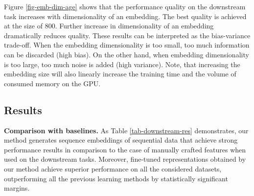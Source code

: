 \documentclass{article}
\begin{document}
Figure \ref{fig-emb-dim-age} shows that the performance quality on the downstream task increases with  dimensionality of an embedding. The best quality is achieved at the size of 800. Further increase in  dimensionality of an embedding dramatically reduces quality.
These results can be interpreted as the bias-variance trade-off. When the embedding dimensionality is too small, too much information can be discarded (high bias). On the other hand, when embedding dimensionality is too large, too much noise is added (high variance).
Note, that increasing the embedding size will also linearly increase the training time and the volume of consumed memory on the GPU.

\subsection{Results} \label{sec-res}

\textbf{Comparison with baselines.} As Table \ref{tab-downstream-res} demonstrates, our method generates sequence embeddings of sequential data that achieve strong performance results in comparison to the case of manually crafted features when used on the downstream tasks. Moreover, fine-tuned representations obtained by our method achieve superior performance on all the considered datasets, outperforming all the previous learning methods by statistically significant margins.
\end{document}
